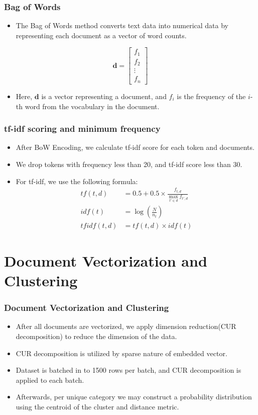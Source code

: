 \documentclass[
    10pt %
    16:9, %
]{beamer}
\begin{document}
\begin{frame}
  \frametitle{Bag of Words}
  \begin{itemize}
    \item The Bag of Words method converts text data into numerical data by representing each document as a vector of word counts.
  \end{itemize}
  \[
    \mathbf{d} = \begin{bmatrix}
    f_1 \\
    f_2 \\
    \vdots \\
    f_n
  \end{bmatrix}
  \]
  \begin{itemize}
    \item Here, \(\mathbf{d}\) is a vector representing a document, and \(f_i\) is the frequency of the \(i\)-th word from the vocabulary in the document.
  \end{itemize}
\end{frame}

\begin{frame}
  \frametitle{tf-idf scoring and minimum frequency}
  \begin{itemize}
    \item After BoW Encoding, we calculate tf-idf score for each token and documents.
    \item We drop tokens with frequency less than 20, and tf-idf score less than 30.
    \item For tf-idf, we use the following formula:
    \begin{align}
      tf(t,d) &= 0.5 + 0.5 \times \frac{f_{t,d}}{\max_{t' \in d} f_{t',d}} \\
      idf(t) &= \log\left(\frac{N}{n_t}\right) \\
      tfidf(t,d) &= tf(t,d) \times idf(t)
    \end{align}
  \end{itemize}
\end{frame}

\section{Document Vectorization and Clustering}
\begin{frame}
  \frametitle{Document Vectorization and Clustering}
  \begin{itemize}
    \item After all documents are vectorized, we apply dimension reduction(CUR decomposition) to reduce the dimension of the data.
    \item CUR decomposition is utilized by sparse nature of embedded vector.
    \item Dataset is batched in to 1500 rows per batch, and CUR decomposition is applied to each batch.
    \item Afterwards, per unique category we may construct a probability distribution using the centroid of the cluster and distance metric.
  \end{itemize}
\end{frame}
\end{document}
